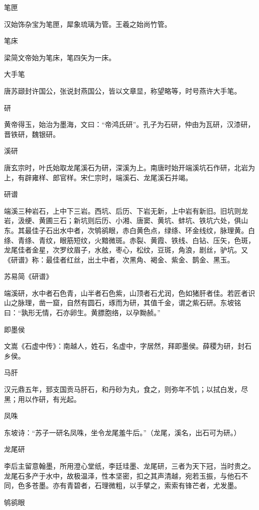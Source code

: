 \documentclass[a4paper,12pt,UTF8,twoside]{ctexbook}
\begin{document}
    笔匣
    
    汉始饰杂宝为笔匣，犀象琉璃为管。王羲之始尚竹管。
    
    笔床
    
    梁简文帝始为笔床，笔四矢为一床。
    
    大手笔
    
    唐苏颋封许国公，张说封燕国公，皆以文章显，称望略等，时号燕许大手笔。
    
    研
    
    黄帝得玉，始治为墨海，文曰：“帝鸿氏研”。孔子为石研，仲由为瓦研，汉漆研，晋铁研，魏银研。
    
    溪研
    
    唐玄宗时，叶氏始取龙尾溪石为研，深溪为上。南唐时始开端溪坑石作研，北岩为上，有辟雍样、郎官样。宋仁宗时，端溪石、龙尾溪石并竭。
    
    研谱
    
    端溪三种岩石，上中下三岩。西坑、后历、下岩无新，上中岩有新旧。旧坑则龙岩，汲绠、黄圃三石；新坑则后历、小湘、唐窦、黄坑、蚌坑、铁坑六处，俱山东。其最佳子石出水中者，次鸲鹆眼，赤白黄色点，绿绦、环金线纹，脉理黄。白绦、青绦、青纹，眼筋短纹，火黯微斑。赤裂、黄霞、铁线、白钻、压矢，色斑，龙尾佳者金星，次罗纹眉子，水舷，枣心，松纹，豆斑，角浪，剧丝，驴坑。又《研谱》称：最佳者红丝，出土中者，次黑角、褐金、紫金、鹊金、黑玉。
    
    苏易简《研谱》
    
    端溪研，水中者石色青，山半者石色紫，山顶者石尤润，色如猪肝者佳。若匠者识山之脉理，凿一窟，自然有圆石，琢而为研，其值千金，谓之紫石研。东坡铭曰：“孰形无情，石亦卵生。黄膘胞络，以孕黝赪。”
    
    即墨侯
    
    文嵩《石虚中传》：南越人，姓石，名虚中，字居然，拜即墨侯。薛稷为研，封石乡侯。
    
    马肝
    
    汉元鼎五年，郅支国贡马肝石，和丹砂为丸，食之，则弥年不饥；以拭白发，尽黑；用以作研，有光起。
    
    凤咮
    
    东坡诗：“苏子一研名凤咮，坐令龙尾羞牛后。”（龙尾，溪名，出石可为研。）
    
    龙尾研
    
    李后主留意翰墨，所用澄心堂纸，李廷珪墨、龙尾研，三者为天下冠，当时贵之。龙尾石多产于水中，故极温泽，性本坚密，扣之其声清越，宛若玉振，与他石不同，色多苍墨。亦有青碧者，石理微粗，以手擘之，索索有锋芒者，尤发墨。
    
    鸲鹆眼
    
\end{document}
